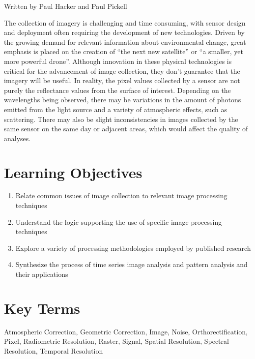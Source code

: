 \documentclass[
]{book}
\providecommand{\tightlist}{%
  \setlength{\itemsep}{0pt}\setlength{\parskip}{0pt}}
\begin{document}
Written by
Paul Hacker and Paul Pickell

The collection of imagery is challenging and time consuming, with sensor design and deployment often requiring the development of new technologies. Driven by the growing demand for relevant information about environmental change, great emphasis is placed on the creation of ``the next new satellite'' or ``a smaller, yet more powerful drone''. Although innovation in these physical technologies is critical for the advancement of image collection, they don't guarantee that the imagery will be useful. In reality, the pixel values collected by a sensor are not purely the reflectance values from the surface of interest. Depending on the wavelengths being observed, there may be variations in the amount of photons emitted from the light source and a variety of atmospheric effects, such as scattering. There may also be slight inconsistencies in images collected by the same sensor on the same day or adjacent areas, which would affect the quality of analyses.

\hypertarget{learning-objectives-12}{%
\section*{Learning Objectives}\label{learning-objectives-12}}

\begin{enumerate}
\def\labelenumi{\arabic{enumi}.}
\tightlist
\item
  Relate common issues of image collection to relevant image processing techniques
\item
  Understand the logic supporting the use of specific image processing techniques
\item
  Explore a variety of processing methodologies employed by published research
\item
  Synthesize the process of time series image analysis and pattern analysis and their applications
\end{enumerate}

\hypertarget{key-terms-12}{%
\section*{Key Terms}\label{key-terms-12}}

Atmospheric Correction, Geometric Correction, Image, Noise, Orthorectification, Pixel, Radiometric Resolution, Raster, Signal, Spatial Resolution, Spectral Resolution, Temporal Resolution
\end{document}

